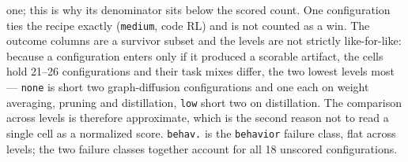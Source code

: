 \begin{table}[t]
{one; this is why its denominator sits below the scored count. One configuration ties the recipe
exactly (\texttt{medium}, code RL) and is not counted as a win. The outcome columns are a
survivor subset and the levels are not strictly like-for-like: because a configuration enters
only if it produced a scorable artifact, the cells hold 21--26 configurations and their task
mixes differ, the two lowest levels most --- \texttt{none} is short two graph-diffusion
configurations and one each on weight averaging, pruning and distillation, \texttt{low} short two
on distillation. The comparison across levels is therefore approximate, which is the second
reason not to read a single cell as a normalized score. \texttt{behav.} is the \texttt{behavior}
failure class, flat across levels; the two failure classes together account for all 18 unscored
configurations.}
\end{table}
